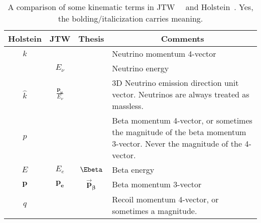 %
%
%
\renewcommand{\arraystretch}{1.6}
\begin{table}[h!!!!t]
	\begin{center}
	\begin{tabular}{ | c | c | c | p{3.35in} | }
		\multicolumn{1}{c}{Holstein} 				& \multicolumn{1}{c}{JTW} 								& \multicolumn{1}{c}{Thesis} 	& \multicolumn{1}{c}{Comments}
		\\  \hline
		$k$											& 														& 								& Neutrino momentum 4-vector%
		\\  \hline
		$ $											& $E_\nu$												& 								& Neutrino energy
		\\  \hline
		$\hat{k}$ 									& $\displaystyle \frac{\mathbf{p_{\bm{\nu}}}}{E_\nu} $	&  %
																																			& 3D Neutrino emission direction unit vector.  Neutrinos are always treated as massless.
		\\  \hline
		$p$											& 														& 								& Beta momentum 4-vector, or sometimes the magnitude of the beta momentum 3-vector.  Never the magnitude of the 4-vector.
		\\  \hline
		$E$											& $E_e$													& $\Ebeta$						& Beta energy
		\\  \hline
		$ \mathbf{p} $								& $\mathbf{p_e}$										& $\bm{\vec{p}_\beta}$			& Beta momentum 3-vector
		\\  \hline
		$q$											&  														&								& Recoil momentum 4-vector, or sometimes a magnitude.
		\\  \hline
	\end{tabular}
	\end{center}
	\caption[Notation Guide]{A comparison of some kinematic terms in JTW~\cite{jtw}~\cite{jtw_coulomb} and Holstein~\cite{holstein}.  Yes, the bolding/italicization carries meaning.  }
	\label{table:compare_notation_kinematic}
\end{table}
\renewcommand{\arraystretch}{1}
%
%